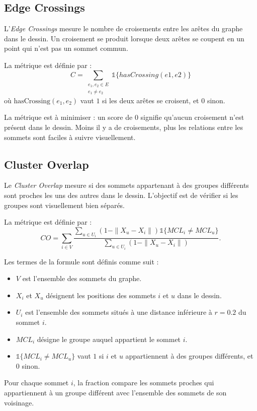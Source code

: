 \documentclass[a4paper,11pt]{article}
\begin{document}
\subsection{Edge Crossings}

L'\textit{Edge Crossings} mesure le nombre de croisements entre les arêtes du graphe dans le dessin. Un croisement se produit lorsque deux arêtes se coupent en un point qui n'est pas un sommet commun.

La métrique est définie par :
\[
C = \sum_{\substack{e_1,e_2\in E\\e_1\neq e_2}}
\mathds{1}\{hasCrossing(e1, e2)\}
\]
où $\text{hasCrossing}(e_1,e_2)$ vaut $1$ si les deux arêtes se croisent, et $0$ sinon.

La métrique est à minimiser : un score de $0$ signifie qu'aucun croisement n'est présent dans le dessin. Moins il y a de croisements, plus les relations entre les sommets sont faciles à suivre visuellement.

\subsection{Cluster Overlap}

Le \textit{Cluster Overlap} mesure si des sommets appartenant à des groupes différents sont proches les uns des autres dans le dessin. L'objectif est de vérifier si les groupes sont visuellement bien séparés.

La métrique est définie par :
\[
CO = \sum_{i\in V}
\frac{
\displaystyle\sum_{u\in U_i}
(1-\|X_u-X_i\|)
\mathds{1}\{MCL_i\neq MCL_u\}
}{
\displaystyle\sum_{u\in U_i}
(1-\|X_u-X_i\|)
}.
\]

Les termes de la formule sont définis comme suit :
\begin{itemize}
    \item $V$ est l'ensemble des sommets du graphe.
    \item $X_i$ et $X_u$ désignent les positions des sommets $i$ et $u$ dans le dessin.
    \item $U_i$ est l'ensemble des sommets situés à une distance inférieure à $r=0.2$ du sommet $i$.
    \item $MCL_i$ désigne le groupe auquel appartient le sommet $i$.
    \item $\mathds{1}\{MCL_i\neq MCL_u\}$ vaut $1$ si $i$ et $u$ appartiennent à des groupes différents, et $0$ sinon.
\end{itemize}

Pour chaque sommet $i$, la fraction compare les sommets proches qui appartiennent à un groupe différent avec l'ensemble des sommets de son voisinage.
\end{document}

